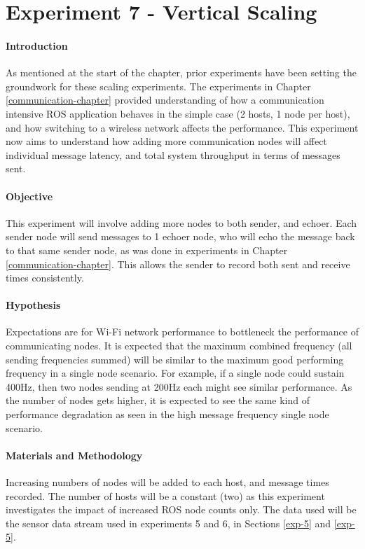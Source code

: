 \documentclass[../dissertation.tex]{subfiles}
\begin{document}
\section{Experiment 7 - Vertical Scaling}
\label{experiment7-vertical-scaling}

\paragraph{Introduction} As mentioned at the start of the chapter, prior experiments have been setting the groundwork for these scaling experiments. The experiments in Chapter \ref{communication-chapter} provided understanding of how a communication intensive ROS application behaves in the simple case (2 hosts, 1 node per host), and how switching to a wireless network affects the performance. This experiment now aims to understand how adding more communication nodes will affect individual message latency, and total system throughput in terms of messages sent.

\paragraph{Objective} This experiment will involve adding more nodes to both sender, and echoer. Each sender node will send messages to 1 echoer node, who will echo the message back to that same sender node, as was done in experiments in Chapter \ref{communication-chapter}. This allows the sender to record both sent and receive times consistently.

\paragraph{Hypothesis} Expectations are for Wi-Fi network performance to bottleneck the performance of communicating nodes. It is expected that the maximum combined frequency (all sending frequencies summed) will be similar to the maximum good performing frequency in a single node scenario. For example, if a single node could sustain 400Hz, then two nodes sending at 200Hz each might see similar performance. As the number of nodes gets higher, it is expected to see the same kind of performance degradation as seen in the high message frequency single node scenario.

\paragraph{Materials and Methodology} Increasing numbers of nodes will be added to each host, and message times recorded. The number of hosts will be a constant (two) as this experiment investigates the impact of increased ROS node counts only. The data used will be the sensor data stream used in experiments 5 and 6, in Sections \ref{exp-5} and \ref{exp-5}.
\end{document}
